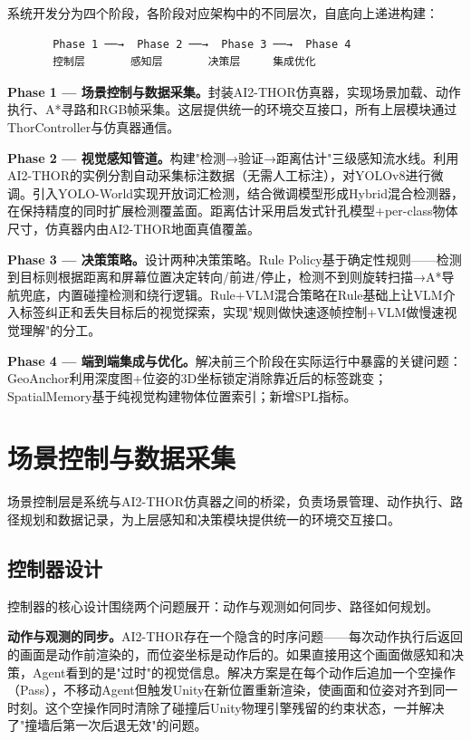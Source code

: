 \documentclass{SYSUReport}
\begin{document}
系统开发分为四个阶段，各阶段对应架构中的不同层次，自底向上递进构建：

\begin{center}
\begin{verbatim}
       Phase 1 ──→  Phase 2 ──→  Phase 3 ──→  Phase 4
       控制层       感知层       决策层     集成优化
\end{verbatim}
\end{center}

\textbf{Phase 1 — 场景控制与数据采集。}封装AI2-THOR仿真器，实现场景加载、动作执行、A*寻路和RGB帧采集。这层提供统一的环境交互接口，所有上层模块通过ThorController与仿真器通信。

\textbf{Phase 2 — 视觉感知管道。}构建"检测→验证→距离估计"三级感知流水线。利用AI2-THOR的实例分割自动采集标注数据（无需人工标注），对YOLOv8进行微调。引入YOLO-World实现开放词汇检测，结合微调模型形成Hybrid混合检测器，在保持精度的同时扩展检测覆盖面。距离估计采用启发式针孔模型+per-class物体尺寸，仿真器内由AI2-THOR地面真值覆盖。

\textbf{Phase 3 — 决策策略。}设计两种决策策略。Rule Policy基于确定性规则——检测到目标则根据距离和屏幕位置决定转向/前进/停止，检测不到则旋转扫描→A*导航兜底，内置碰撞检测和绕行逻辑。Rule+VLM混合策略在Rule基础上让VLM介入标签纠正和丢失目标后的视觉探索，实现"规则做快速逐帧控制+VLM做慢速视觉理解"的分工。

\textbf{Phase 4 — 端到端集成与优化。}解决前三个阶段在实际运行中暴露的关键问题：GeoAnchor利用深度图+位姿的3D坐标锁定消除靠近后的标签跳变；SpatialMemory基于纯视觉构建物体位置索引；新增SPL指标。

\section{场景控制与数据采集}

场景控制层是系统与AI2-THOR仿真器之间的桥梁，负责场景管理、动作执行、路径规划和数据记录，为上层感知和决策模块提供统一的环境交互接口。

\subsection{控制器设计}

控制器的核心设计围绕两个问题展开：动作与观测如何同步、路径如何规划。


\textbf{动作与观测的同步。}AI2-THOR存在一个隐含的时序问题——每次动作执行后返回的画面是动作前渲染的，而位姿坐标是动作后的。如果直接用这个画面做感知和决策，Agent看到的是"过时"的视觉信息。解决方案是在每个动作后追加一个空操作（Pass），不移动Agent但触发Unity在新位置重新渲染，使画面和位姿对齐到同一时刻。这个空操作同时清除了碰撞后Unity物理引擎残留的约束状态，一并解决了"撞墙后第一次后退无效"的问题。
\end{document}
